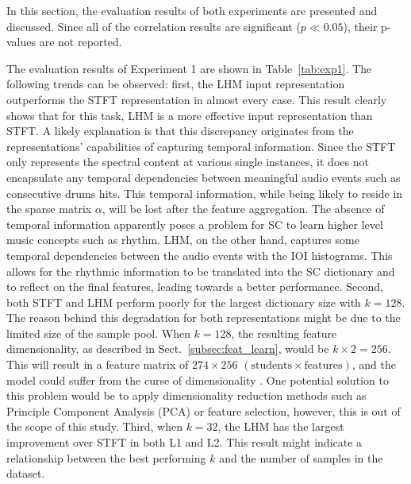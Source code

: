 \documentclass[conference]{IEEEtran}
\begin{document}
In this section, the evaluation results of both experiments are presented and discussed. Since all of the correlation results are significant ($p\ll 0.05$), their p-values are not reported.  

The evaluation results of Experiment 1 are shown in Table~\ref{tab:exp1}. The following trends can be observed: first, the LHM input representation outperforms the STFT representation in almost every case. This result clearly shows that for this task, LHM is a more effective input representation than STFT. A likely explanation is that this discrepancy originates from the representations' capabilities of capturing temporal information. Since the STFT only represents the spectral content at various single instances, it does not encapsulate any temporal dependencies between meaningful audio events such as consecutive drums hits. This temporal information, while being likely to reside in the sparse matrix $\alpha$, will be lost after the feature aggregation. The absence of temporal information apparently poses a problem for SC to learn higher level music concepts such as rhythm. LHM, on the other hand, captures some temporal dependencies between the audio events with the IOI histograms. This allows for the rhythmic information to be translated into the SC dictionary and to reflect on the final features, leading towards a better performance. 
Second, both STFT and LHM perform poorly for the largest dictionary size with $k = 128$. The reason behind this degradation for both representations might be due to the limited size of the sample pool. When $k = 128$, the resulting feature dimensionality, as described in Sect.~\ref{subsec:feat_learn}, would be $k \times 2 = 256$. This will result in a feature matrix of $274 \times 256$ $(\text{students} \times \text{features})$, and the model could suffer from the curse of dimensionality \cite{Bishop2006}. One potential solution to this problem would be to apply dimensionality reduction methods such as Principle Component Analysis (PCA) or feature selection, however, this is out of the scope of this study. 
Third, when $k = 32$, the LHM has the largest improvement over STFT in both L1 and L2. This result might indicate a relationship between the best performing $k$ and the number of samples in the dataset.
\end{document}
